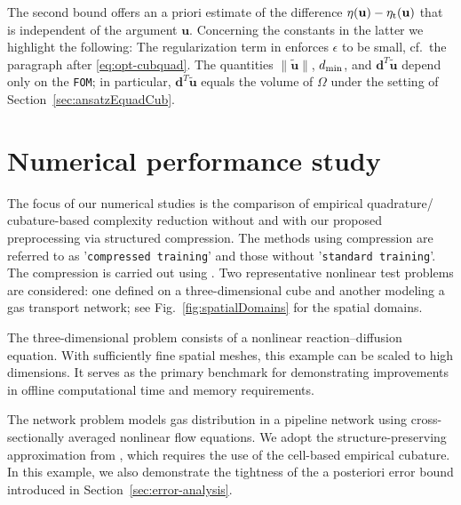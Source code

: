 \documentclass[onefignum,onetabnum]{siamart251104}
\newcommand{\bv}[1]{{\mathbf #1}}
\newcommand{\thi}[1]{{{#1}_{\rm{t}}}}	%
\newcommand{\acro}[1]{{\texttt{#1}}}  %
\newcommand{\vwei}{\bv{u}} %
\newcommand{\fopt}{{\eta}}
\newcommand{\dreg}{{{\bv{d}}}}
\begin{document}
%
The second bound offers an a priori estimate of the difference $\fopt(\vwei) - \thi{\fopt}(\vwei)$ that is independent of the argument $\vwei$. Concerning the constants in the latter we highlight the following: The regularization term in  enforces $\epsilon$ to be small, cf.~the paragraph after \eqref{eq:opt-cubquad}. The quantities $\|\tilde{\vwei}\|$, $d_{\rm min}$, and $\dreg^T \tilde{\vwei}$ depend only on the \acro{FOM}; in particular, $\dreg^T \tilde{\vwei}$ equals the volume of $\Omega$ under the setting of Section~\ref{sec:ansatzEquadCub}.



\newcommand{\blsVertex}{{{\nu}}} 
 \newcommand{\Onepipe}{e}
\newcommand{\tfb}{w}


\newcommand{\xrea}{{\rho}}
\newcommand{\xDom}{{\Omega}}
\newcommand{\xSurf}{{\Gamma}}
\newcommand{\cTests}{{C}}


\newcommand{\SKFEM}{\acro{SKFEM}}



\section{Numerical performance study} \label{sec:numericPerformance}
The focus of our numerical studies is the comparison of empirical quadrature/ cubature-based complexity reduction without and with our proposed preprocessing via structured compression. The methods using compression are referred to as '\acro{compressed training}' and those without '\acro{standard training}'. The compression is carried out using . Two representative nonlinear test problems are considered: one defined on a three-dimensional cube and another modeling a gas transport network; see Fig.~\ref{fig:spatialDomains} for the spatial domains.

The three-dimensional problem consists of a nonlinear reaction–diffusion equation. With sufficiently fine spatial meshes, this example can be scaled to high dimensions. It serves as the primary benchmark for demonstrating improvements in offline computational time and memory requirements.

The network problem models gas distribution in a pipeline network using cross-sectionally averaged nonlinear flow equations. We adopt the structure-preserving approximation from \cite{art:bls-snapBasedMorComp}, which requires the use of the cell-based empirical cubature. In this example, we also demonstrate the tightness of the a posteriori error bound introduced in Section~\ref{sec:error-analysis}.
\end{document}
